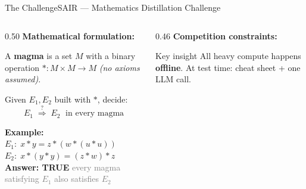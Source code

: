\documentclass[aspectratio=169,10pt]{beamer}
\newcommand{\cy}[1]{\textcolor{AccentBlue}{\textbf{#1}}}
\newcommand{\gn}[1]{\textcolor{AccentGreen}{\textbf{#1}}}
\begin{document}
\begin{frame}{The Challenge}{SAIR — Mathematics Distillation Challenge}
\begin{columns}[T,onlytextwidth]
  \begin{column}{0.50\textwidth}
    \vspace{4mm}
    \cy{Mathematical formulation:}
    \vspace{3mm}

    A \textbf{magma} is a set $M$ with a binary operation
    ${\ast}:M\!\times\!M\to M$ \textit{(no axioms assumed)}.

    \vspace{4mm}
    Given $E_1, E_2$ built with $\ast$, decide:
    \[
      \boxed{\;E_1 \;\overset{?}{\Longrightarrow}\; E_2
             \;\text{ in every magma}\;}
    \]

    \vspace{4mm}
    \textbf{Example:}\\[3pt]
    $E_1{:}\; x \ast y = z \ast (w \ast (u \ast u))$\\[2pt]
    $E_2{:}\; x \ast (y \ast y) = (z \ast w) \ast z$\\[4pt]
    \gn{Answer: TRUE}
    \hfill\textcolor{gray}{\tiny every magma satisfying $E_1$ also satisfies $E_2$}
  \end{column}
  \hfill
  \begin{column}{0.46\textwidth}
    \vspace{2mm}
    \cy{Competition constraints:}
    \vspace{2mm}


    \vspace{4mm}
    \begin{block}{Key insight}
      All heavy compute happens \textbf{offline}.
      At test time: cheat sheet + one LLM call.
    \end{block}
  \end{column}
\end{columns}
\end{frame}
\end{document}
